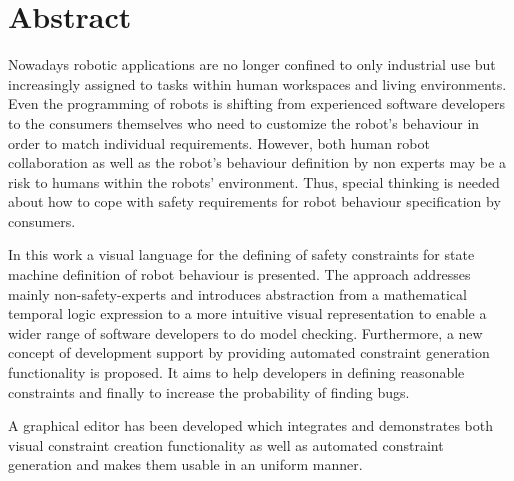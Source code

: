 \chapter*{Abstract}

Nowadays robotic applications are no longer confined to only industrial use but increasingly assigned to tasks within human workspaces and living environments. Even the programming of robots is shifting from experienced software developers to the consumers themselves who need to customize the robot's behaviour in order to match individual requirements.
However, both human robot collaboration as well as the robot's behaviour definition by non experts may be a risk to humans within the robots' environment.
Thus, special thinking is needed about how to cope with safety requirements for robot behaviour specification by consumers.

In this work a visual language for the defining of safety constraints for state machine definition of robot behaviour is presented. The approach addresses mainly non-safety-experts and introduces abstraction from a mathematical temporal logic expression to a more intuitive visual representation to enable a wider range of software developers to do model checking.
Furthermore, a new concept of development support by providing automated constraint generation functionality is proposed. It aims to help developers in defining reasonable constraints and finally to increase the probability of finding bugs.

A graphical editor has been developed which integrates and demonstrates both visual constraint creation functionality as well as automated constraint generation and makes them usable in an uniform manner.
